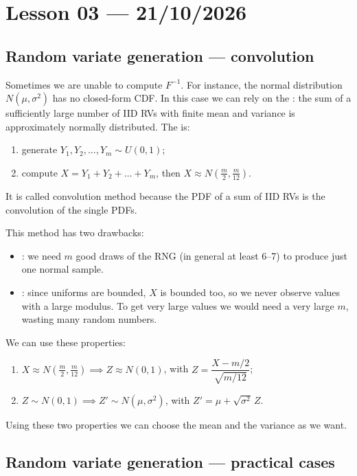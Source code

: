 \section{Lesson 03 --- 21/10/2026}

\subsection{Random variate generation --- convolution}

Sometimes we are unable to compute $F^{-1}$. For instance, the normal distribution $N(\mu, \sigma^2)$ has no closed-form CDF. In this case we can rely on the : the sum of a sufficiently large number of IID RVs with finite mean and variance is approximately normally distributed. The  is:
\begin{enumerate}
\item generate $Y_1, Y_2, \dots, Y_m \sim U(0,1)$;
\item compute $X = Y_1 + Y_2 + \dots + Y_m$, then $X \approx N\left(\frac{m}{2}, \frac{m}{12}\right)$.
\end{enumerate}
It is called convolution method because the PDF of a sum of IID RVs is the convolution of the single PDFs.

This method has two drawbacks:
\begin{itemize}
\item {}: we need $m$ good draws of the RNG (in general at least 6--7) to produce just one normal sample.
\item {}: since uniforms are bounded, $X$ is bounded too, so we never observe values with a large modulus. To get very large values we would need a very large $m$, wasting many random numbers.
\end{itemize}

We can use these properties:
\begin{enumerate}
\item $X \approx N\left(\frac{m}{2}, \frac{m}{12}\right) \implies Z \approx N(0,1)$, with $Z = \dfrac{X - m/2}{\sqrt{m/12}}$;
\item $Z \sim N(0,1) \implies Z' \sim N(\mu, \sigma^2)$, with $Z' = \mu + \sqrt{\sigma^2}\, Z$.
\end{enumerate}

Using these two properties we can choose the mean and the variance as we want.

\subsection{Random variate generation --- practical cases}

